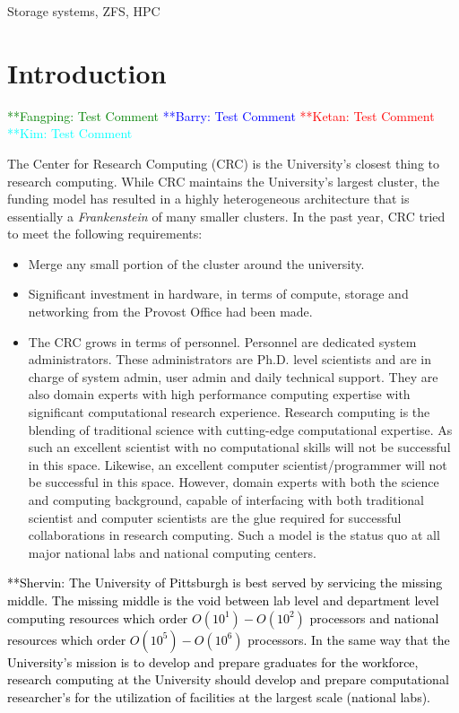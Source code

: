 \documentclass[conference]{IEEEtran}
\newcommand{\fp}[1]{ {\textcolor{green}    { **Fangping:  #1 }}}
\newcommand{\bm}[1]{ {\textcolor{blue}    { **Barry:  #1 }}}
\newcommand{\kim}[1]{ {\textcolor{cyan}    { **Kim:  #1 }}}
\newcommand{\shervin}[1]{ {\textcolor{black}    { **Shervin:  #1 }}}
\newcommand{\ketan}[1]{ {\textcolor{red}    { **Ketan:  #1 }}}
\begin{document}
\begin{IEEEkeywords}
Storage systems, ZFS, HPC
\end{IEEEkeywords}



\section{Introduction}

\fp{ Test Comment } \bm{ Test Comment } \ketan{ Test Comment }  \kim{ Test Comment }


The Center for Research Computing (CRC) is the University's closest thing to research computing.
While CRC maintains the University's largest cluster, the
funding model has resulted in a highly heterogeneous architecture that is essentially a {\it Frankenstein} of
many smaller clusters. In the past year, CRC tried to meet the following requirements:

\begin{itemize}

\item Merge any small portion of the cluster around the university. 

\item Significant investment in hardware, in terms of compute, storage and networking from the Provost Office had been made. 

\item The CRC grows in terms of personnel. Personnel are dedicated system administrators. These administrators are Ph.D. level scientists and are in charge of system admin, user admin and daily
technical support. They are also domain experts with high performance computing expertise with significant computational research experience. Research computing is the blending of traditional science with cutting-edge computational expertise. As such an excellent scientist with no computational skills will not
be successful in this space. Likewise, an excellent computer scientist/programmer will not be successful in this space. However, domain experts with both the science and computing background,
capable of interfacing with both traditional scientist and computer scientists are the glue required
for successful collaborations in research computing. Such a model is the status quo at all major
national labs and national computing centers.

\end{itemize}


\shervin{
The University of Pittsburgh is best served by servicing the missing middle. The missing middle is the void
between lab level and department level computing resources which order $O(10^1)-O(10^2)$ processors and national resources which order $O(10^5)-O(10^6)$ processors. In the same way that the
University's mission is to develop and prepare graduates for the workforce, research computing
at the University should develop and prepare computational researcher's for the utilization of
facilities at the largest scale (national labs).}
\end{document}
